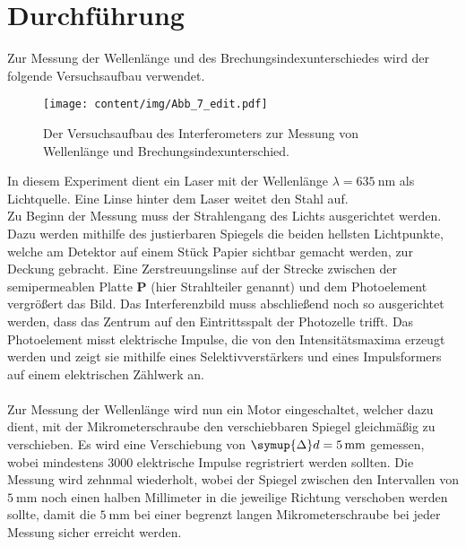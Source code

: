 \section{Durchführung}

    Zur Messung der Wellenlänge und des Brechungsindexunterschiedes wird der folgende Versuchsaufbau verwendet.

    \begin{figure}
        \centering
        \texttt{[image: content/img/Abb\_7\_edit.pdf]}
        \caption{Der Versuchsaufbau des Interferometers zur Messung von Wellenlänge und Brechungsindexunterschied.}
    \end{figure}

    In diesem Experiment dient ein Laser mit der Wellenlänge $\lambda = \SI{635}{\nano\meter}$ als Lichtquelle.
    Eine Linse hinter dem Laser weitet den Stahl auf.\\
    Zu Beginn der Messung muss der Strahlengang des Lichts ausgerichtet werden.
    Dazu werden mithilfe des justierbaren Spiegels die beiden hellsten Lichtpunkte,
    welche am Detektor auf einem Stück Papier sichtbar gemacht werden,
    zur Deckung gebracht.
    Eine Zerstreuungslinse auf der Strecke zwischen der semipermeablen Platte \textbf{P} (hier Strahlteiler genannt) und dem Photoelement vergrößert das Bild.
    Das Interferenzbild muss abschließend noch so ausgerichtet werden,
    dass das Zentrum auf den Eintrittsspalt der Photozelle trifft.
    Das Photoelement misst elektrische Impulse,
    die von den Intensitätsmaxima erzeugt werden
    und zeigt sie mithilfe eines Selektivverstärkers
    und eines Impulsformers auf einem elektrischen Zählwerk an.\\
    \\
    Zur Messung der Wellenlänge wird nun ein Motor eingeschaltet,
    welcher dazu dient,
    mit der Mikrometerschraube den verschiebbaren Spiegel gleichmäßig zu verschieben.
    Es wird eine Verschiebung von $\symup{\Delta}d = \SI{5}{\milli\meter}$ gemessen,
    wobei mindestens $3000$ elektrische Impulse regristriert werden sollten.
    Die Messung wird zehnmal wiederholt,
    wobei der Spiegel zwischen den Intervallen von $\SI{5}{\milli\meter}$ noch einen halben Millimeter in die jeweilige Richtung verschoben werden sollte,
    damit die $\SI{5}{\milli\meter}$ bei einer begrenzt langen Mikrometerschraube bei jeder Messung sicher erreicht werden.
